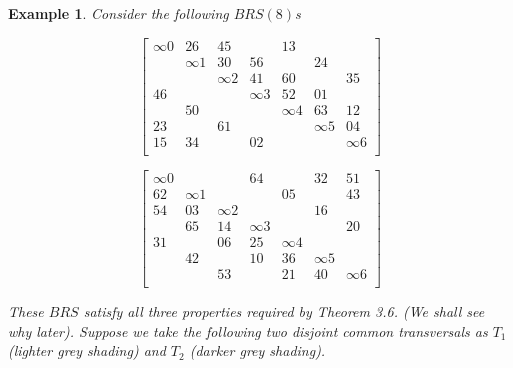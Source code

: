 \documentclass[
  11pt,
  a4paper]{book}
\newtheorem{example}{Example}
\begin{document}
\begin{example}
Consider the following $BRS(8)$s

\begin{equation}
  \begin{bmatrix}
    \infty 0 &    26    &    45    &            &    13    &            &          \\
             & \infty 1 &    30    &     56     &          &     24     &          \\
             &          & \infty 2 &     41     &    60    &            &    35    \\
      46     &          &          &  \infty 3  &    52    &     01     &          \\
             &    50    &          &            & \infty 4 &     63     &    12    \\
      23     &          &    61    &            &          &  \infty 5  &    04    \\
      15     &    34    &          &     02     &          &            & \infty 6 \\
  \end{bmatrix}
\end{equation}

\begin{equation}
  \begin{bmatrix}
    \infty 0 &          &          &     64     &          &     32     &    51    \\
      62     & \infty 1 &          &            &    05    &            &    43    \\
      54     &    03    & \infty 2 &            &          &     16     &          \\
             &    65    &    14    &  \infty 3  &          &            &    20    \\
      31     &          &    06    &     25     & \infty 4 &            &          \\
             &    42    &          &     10     &    36    &  \infty 5  &          \\
             &          &    53    &            &    21    &     40     & \infty 6 \\
  \end{bmatrix}
\end{equation}

These $BRS$ satisfy all three properties required by Theorem 3.6. (We
shall see why later).
Suppose we take the following two disjoint common transversals as $T_1$
(lighter grey shading) and $T_2$ (darker grey shading).


\end{example}
\end{document}
